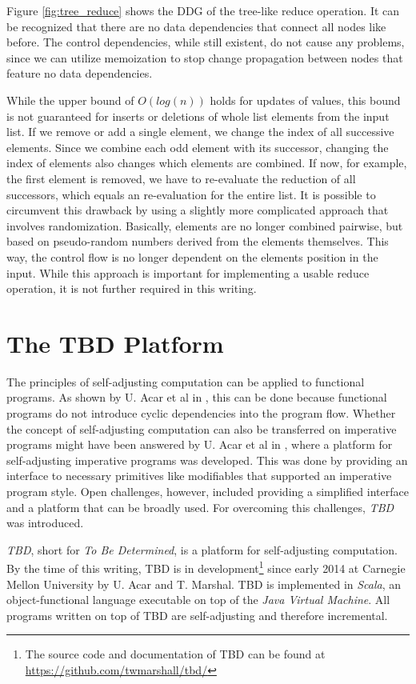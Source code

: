 Figure \ref{fig:tree_reduce} shows the DDG of the tree-like reduce operation. It can be recognized that there are no data dependencies that connect all nodes like before. The control dependencies, while still existent, do not cause any problems, since we can utilize memoization to stop change propagation between nodes that feature no data dependencies. 

While the upper bound of $O(log(n))$ holds for updates of values, this bound is not guaranteed for inserts or deletions of whole list elements from the input list. If we remove or add a single element, we change the index of all successive elements. Since we combine each odd element with its successor, changing the index of elements also changes which elements are combined. If now, for example, the first element is removed, we have to re-evaluate the reduction of all successors, which equals an re-evaluation for the entire list. 
It is possible to circumvent this drawback by using a slightly more complicated approach that involves randomization. Basically, elements are no longer combined pairwise, but based on pseudo-random numbers derived from the elements themselves. This way, the control flow is no longer dependent on the elements position in the input. While this approach is important for implementing a usable reduce operation, it is not further required in this writing. 
\chapter{The TBD Platform}
\label{ch:tbd_platform}

The principles of self-adjusting computation can be applied to functional programs. As shown by U. Acar et al in \cite{acar2007consistent}, this can be done because functional programs do not introduce cyclic dependencies into the program flow. Whether the concept of self-adjusting computation can also be transferred on imperative programs might have been answered by U. Acar et al in \cite{Acar2008}, where a platform for self-adjusting imperative programs was developed. This was done by providing an interface to necessary primitives like modifiables that supported an imperative program style. Open challenges, however, included providing a simplified interface and a platform that can be broadly used. For overcoming this challenges, \textit{TBD} was introduced. 

\textit{TBD}, short for \textit{To Be Determined}, is a platform for self-adjusting computation. By the time of this writing, TBD is in development\footnote{The source code and documentation of TBD can be found at \url{https://github.com/twmarshall/tbd/}} since early 2014 at Carnegie Mellon University by U. Acar and T. Marshal. TBD is implemented in \textit{Scala}, an object-functional language executable on top of the \textit{Java Virtual Machine}. All programs written on top of TBD are self-adjusting and therefore incremental.

